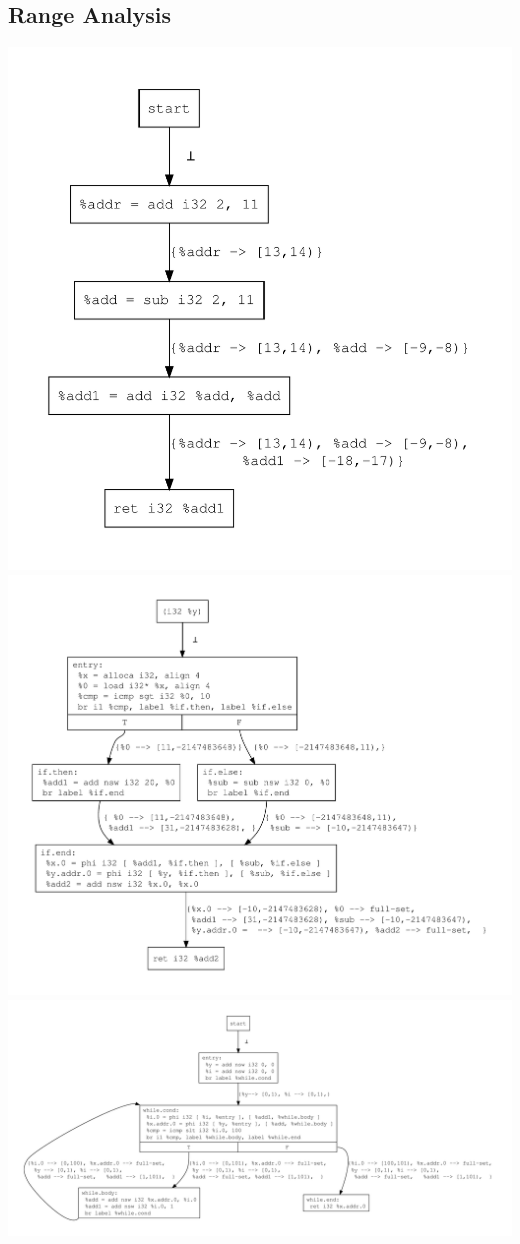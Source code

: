 \documentclass{article}
\theoremstyle{definition}
\begin{document}
\subsection{Range Analysis}
\includegraphics[scale=.4]{figures/ra/simple_add/simple_add.pdf}
\includegraphics[scale=.4]{figures/ra/simple_branch/simple_branch.pdf}
\includegraphics[scale=.4]{figures/ra/loop/loop.pdf}
\end{document}
